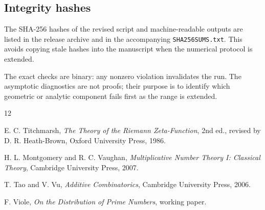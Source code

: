 \documentclass[11pt]{article}
\theoremstyle{definition}
\newcommand{\1}{\mathbf{1}}
\begin{document}
\subsection{Integrity hashes}

The SHA-256 hashes of the revised script and machine-readable outputs are listed in the release archive and in the accompanying \texttt{SHA256SUMS.txt}.  This avoids copying stale hashes into the manuscript when the numerical protocol is extended.

The exact checks are binary: any nonzero violation invalidates the run. The asymptotic diagnostics are not proofs; their purpose is to identify which geometric or analytic component fails first as the range is extended.

\begin{thebibliography}{12}

E. C. Titchmarsh,
\emph{The Theory of the Riemann Zeta-Function},
2nd ed., revised by D. R. Heath-Brown,
Oxford University Press, 1986.

H. L. Montgomery and R. C. Vaughan,
\emph{Multiplicative Number Theory I: Classical Theory},
Cambridge University Press, 2007.

T. Tao and V. Vu,
\emph{Additive Combinatorics},
Cambridge University Press, 2006.

F. Viole,
\emph{On the Distribution of Prime Numbers},
working paper.


\end{thebibliography}
\end{document}

